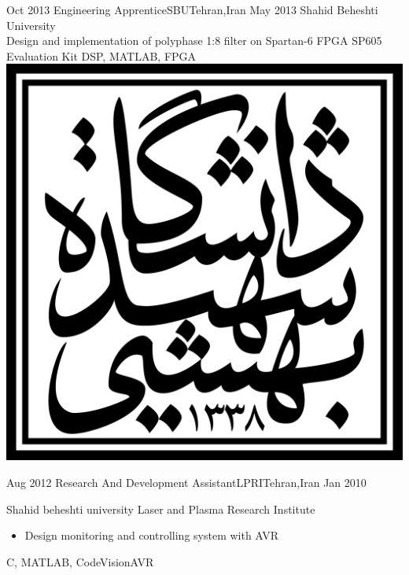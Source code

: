 \begin{experiences}
  \emptySeparator

  \experience
  {Oct 2013} {Engineering Apprentice}{SBU}{Tehran,Iran}
  {May 2013} {
    Shahid Beheshti University
    \\ Design and implementation of polyphase 1:8 filter on Spartan-6 FPGA SP605 Evaluation Kit
  }
  {DSP, MATLAB, FPGA}
  {\includegraphics[scale=0.05]{graphics/SBU_logo}}

  \emptySeparator

  \experience
  {Aug 2012} {Research And Development Assistant}{LPRI}{Tehran,Iran}
  {Jan 2010} {
    Shahid beheshti university Laser and Plasma Research Institute
    \begin{itemize}
      \item Design  monitoring and controlling system with AVR
    \end{itemize}
  }
  {C, MATLAB, CodeVisionAVR}
  {}

  \emptySeparator

\end{experiences}
